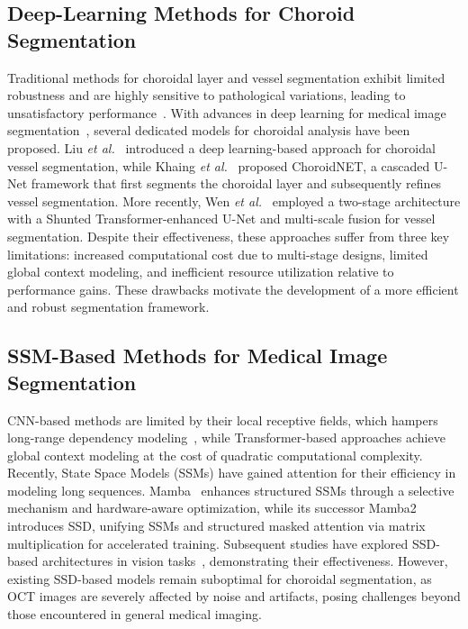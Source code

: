 \documentclass[lettersize,journal]{IEEEtran}
\begin{document}
\subsection{Deep-Learning Methods for Choroid Segmentation}
Traditional methods for choroidal layer and vessel segmentation exhibit limited robustness and are highly sensitive to pathological variations, leading to unsatisfactory performance~\cite{tmm_satnet_1,tmm_4,tmm_5}.
With advances in deep learning for medical image segmentation~\cite{tmm_8}, several dedicated models for choroidal analysis have been proposed.
Liu \textit{et al.}~\cite{Liu2019refine} introduced a deep learning-based approach for choroidal vessel segmentation, while Khaing \textit{et al.}~\cite{choroidnet} proposed ChoroidNET, a cascaded U-Net framework that first segments the choroidal layer and subsequently refines vessel segmentation.
More recently, Wen \textit{et al.}~\cite{wen2024} employed a two-stage architecture with a Shunted Transformer-enhanced U-Net and multi-scale fusion for vessel segmentation.
Despite their effectiveness, these approaches suffer from three key limitations: increased computational cost due to multi-stage designs, limited global context modeling, and inefficient resource utilization relative to performance gains.
These drawbacks motivate the development of a more efficient and robust segmentation framework.

\subsection{SSM-Based Methods for Medical Image Segmentation}
CNN-based methods are limited by their local receptive fields, which hampers long-range dependency modeling~\cite{tmm_2,tmm_6}, while Transformer-based approaches achieve global context modeling at the cost of quadratic computational complexity.
Recently, State Space Models (SSMs) have gained attention for their efficiency in modeling long sequences. Mamba~\cite{gu2024mamba} enhances structured SSMs through a selective mechanism and hardware-aware optimization, while its successor Mamba2~\cite{dao2024transformers} introduces SSD, unifying SSMs and structured masked attention via matrix multiplication for accelerated training. Subsequent studies have explored SSD-based architectures in vision tasks~\cite{shi2024vssdvisionmambanoncausal}, demonstrating their effectiveness.
However, existing SSD-based models remain suboptimal for choroidal segmentation, as OCT images are severely affected by noise and artifacts, posing challenges beyond those encountered in general medical imaging.
\end{document}
